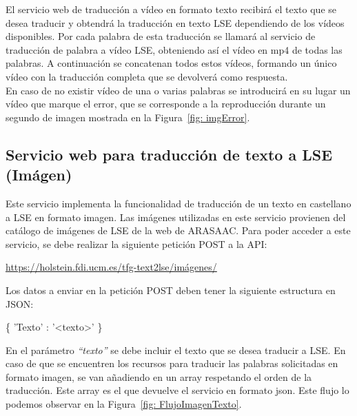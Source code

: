 El servicio web de traducción a vídeo en formato texto recibirá el texto que se desea traducir y obtendrá la traducción en texto LSE dependiendo de los vídeos disponibles. Por cada palabra de esta traducción se llamará al servicio de traducción de palabra a vídeo LSE, obteniendo así el vídeo en mp4 de todas las palabras. A continuación se concatenan todos estos vídeos, formando un único vídeo con la traducción completa que se devolverá como respuesta.\\

En caso de no existir vídeo de una o varias palabras se introducirá en su lugar un vídeo que marque el error, que se corresponde a la reproducción durante un segundo de imagen mostrada en la Figura~\ref {fig: imgError}.

\subsection{Servicio web para traducción de texto a LSE (Imágen)}
Este servicio implementa la funcionalidad de traducción de un texto en castellano a LSE en formato imagen. Las imágenes utilizadas en este servicio provienen del catálogo de imágenes de LSE de la web de ARASAAC. Para poder acceder a este servicio, se debe realizar la siguiente petición POST a la API:\\

\begin{shaded}
	\url{https://holstein.fdi.ucm.es/tfg-text2lse/imágenes/  }	
\end{shaded}

Los datos a enviar en la petición POST deben tener la siguiente estructura en JSON:

\begin{center}
	
	\{ 'Texto' : '<texto>' \}
	
\end{center}


En el parámetro \textit{``texto''} se debe incluir el texto que se desea traducir a LSE. En caso de que se encuentren los recursos para traducir las palabras solicitadas en formato imagen, se van añadiendo en un array respetando el orden de la traducción. Este array es el que devuelve el servicio en formato json. Este flujo lo podemos observar en la Figura~\ref {fig: FlujoImagenTexto}.\\

